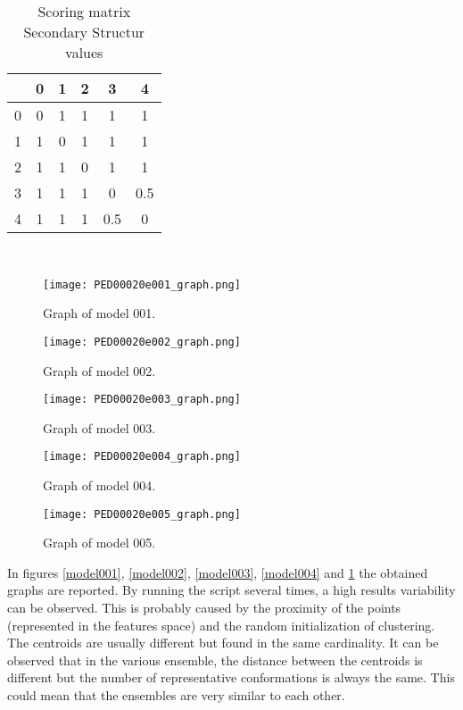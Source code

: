 \begin{table}
\begin{center}
\begin{tabular}{c|ccccc}
& 0 & 1 & 2 & 3 & 4 \\
\hline
0 & 0 & 1 & 1 & 1 & 1\\
1 & 1 & 0 & 1 & 1 & 1\\
2 & 1 & 1 & 0 & 1 & 1\\
3 & 1 & 1 & 1 & 0 & 0.5\\
4 & 1 & 1 & 1 & 0.5 & 0\\
\end{tabular}
\end{center}
\caption{Scoring matrix Secondary Structur values}~\label{tab:score}
\end{table}

\begin{figure}[H]
	\begin{minipage}[b]{0.47\textwidth}
		\centering
		\texttt{[image: PED00020e001\_graph.png]}
		\caption{Graph of model 001.}
		\label{model001}
	\end{minipage}
	\hfill
	\begin{minipage}[b]{0.47\textwidth}
		\centering
		\texttt{[image: PED00020e002\_graph.png]}
		\caption{Graph of model 002.}
		\label{model002}
	\end{minipage}
	\hfill
	\begin{minipage}[b]{0.47\textwidth}
		\centering
		\texttt{[image: PED00020e003\_graph.png]}
		\caption{Graph of model 003.}
		\label{model003}
	\end{minipage}
	\begin{minipage}[b]{0.47\textwidth}
		\centering
		\texttt{[image: PED00020e004\_graph.png]}
		\caption{Graph of model 004.}
		\label{model004}
	\end{minipage}
	\hfill
	\begin{minipage}[b]{0.47\textwidth}
		\centering
		\texttt{[image: PED00020e005\_graph.png]}
		\caption{Graph of model 005.}
		\label{model005}
	\end{minipage}
	\end{figure}

In figures \ref{model001}, \ref{model002}, \ref{model003}, \ref{model004} and \ref{model005} the obtained graphs are reported. By running the script several times, a high results variability can be observed.
This is probably caused by the proximity of the points (represented in the features space) and the random initialization of clustering. The centroids are usually different but found in the same cardinality.
It can be observed that in the various ensemble, the distance between the centroids is different but the number of representative conformations is always the same. This could mean that the ensembles are very similar to each other. %



